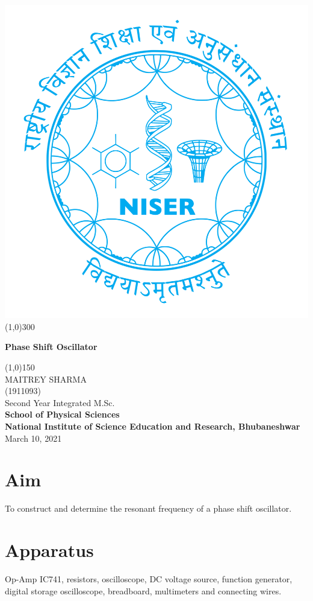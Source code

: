 \begin{titlepage}
\begin{center}
\includegraphics[scale=0.15]{Documents/niser.png}
\line(1,0){300}\\
[2mm]
\begin{large}
\textbf{\huge Phase Shift Oscillator}\\ 
\end{large}
\line(1,0){150}\\
[5cm]
\large MAITREY SHARMA\\
\small (1911093)\\
[4.5cm]
Second Year Integrated M.Sc.\\
\textbf{School of Physical Sciences}\\
\textbf{National Institute of Science Education and Research, Bhubaneshwar}\\
\small March 10, 2021
\end{center} 
\end{titlepage}
\newpage
\section{Aim}
\noindent To construct and determine the resonant frequency of a phase shift oscillator.
\section{Apparatus}
\noindent Op-Amp IC741, resistors, oscilloscope, DC voltage source, function generator, digital storage oscilloscope, breadboard, multimeters and connecting wires.
